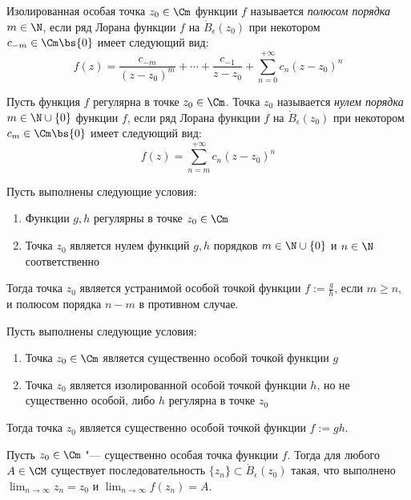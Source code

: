 \begin{definition}
	Изолированная особая точка $z_0 \in \Cm$ функции $f$ называется \textit{полюсом порядка $m \in \N$}, если ряд Лорана функции $f$ на $\mathring B_\epsilon(z_0)$ при некотором $c_{-m} \in \Cm \bs \{0\}$ имеет следующий вид:
	\[f(z) = \frac{c_{-m}}{(z-z_0)^m} + \dotsb + \frac{c_{-1}}{z-z_0} + \sum_{n = 0}^{+\infty}c_n(z - z_0)^n\]
\end{definition}

\begin{definition}
	Пусть функция $f$ регулярна в точке $z_0 \in \Cm$. Точка $z_0$ называется \textit{нулем порядка $m \in \N \cup \{0\}$} функции $f$, если ряд Лорана функции $f$ на $\mathring B_\epsilon(z_0)$ при некотором $c_{m} \in \Cm \bs \{0\}$ имеет следующий вид:
	\[f(z) = \sum_{n = m}^{+\infty}c_n(z - z_0)^n\]
\end{definition}

\begin{proposition}
	Пусть выполнены следующие условия:
	\begin{enumerate}
		\item Функции $g, h$ регулярны в точке $z_0 \in \Cm$
		\item Точка $z_0$ является нулем функций $g, h$ порядков $m \in \N \cup \{0\}$ и $n \in \N$ соответственно
	\end{enumerate}
	
	Тогда точка $z_0$ является устранимой особой точкой функции $f := \frac{g}{h}$, если $m \ge n$, и полюсом порядка $n - m$ в противном случае.
\end{proposition}

\begin{proposition}
	Пусть выполнены следующие условия:
	\begin{enumerate}
		\item Точка $z_0 \in \Cm$ является существенно особой точкой функции $g$
		\item Точка $z_0$ является изолированной особой точкой функции $h$, но не существенно особой, либо $h$ регулярна в точке $z_0$ 
	\end{enumerate}
	
	Тогда точка $z_0$ является существенно особой точкой функции $f := gh$.
\end{proposition}

\begin{theorem}[Сохоцкого]
	Пусть $z_0 \in \Cm$ "--- существенно особая точка функции $f$. Тогда для любого $A \in \CM$ существует последовательность $\{z_n\} \subset \mathring B_\epsilon(z_0)$ такая, что выполнено $\lim_{n \to \infty}z_n = z_0$ и $\lim_{n \to \infty}f(z_n) = A$.
\end{theorem}

